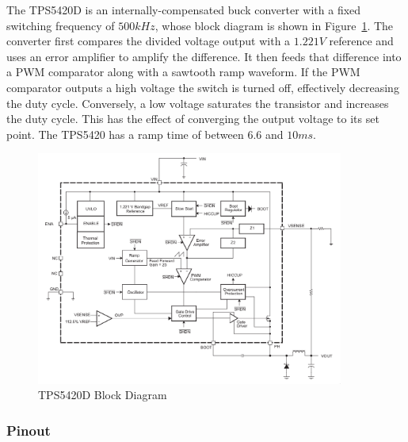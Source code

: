 The TPS5420D is an internally-compensated buck converter with a fixed switching frequency of
$500\si{kHz}$, whose block diagram is shown in Figure~\ref{fig:tps5420d-block}. The converter first
compares the divided voltage output with a $1.221V$ reference and uses an error amplifier to amplify
the difference. It then feeds that difference into a PWM comparator along with a sawtooth ramp
waveform. If the PWM comparator outputs a high voltage the switch is turned off, effectively
decreasing the duty cycle. Conversely, a low voltage saturates the transistor and increases the duty
cycle. This has the effect of converging the output voltage to its set point. The TPS5420 has a ramp
time of between $6.6$ and $10 \si{ms}$.

\begin{figure}[h]
        \centering
        \includegraphics[width=0.9\textwidth]{data/tps5420d-block-diagram}
        \caption{TPS5420D Block Diagram}
        \label{fig:tps5420d-block}
\end{figure}

\subsubsection{Pinout}
\label{sec:tps5420d-pinout}


